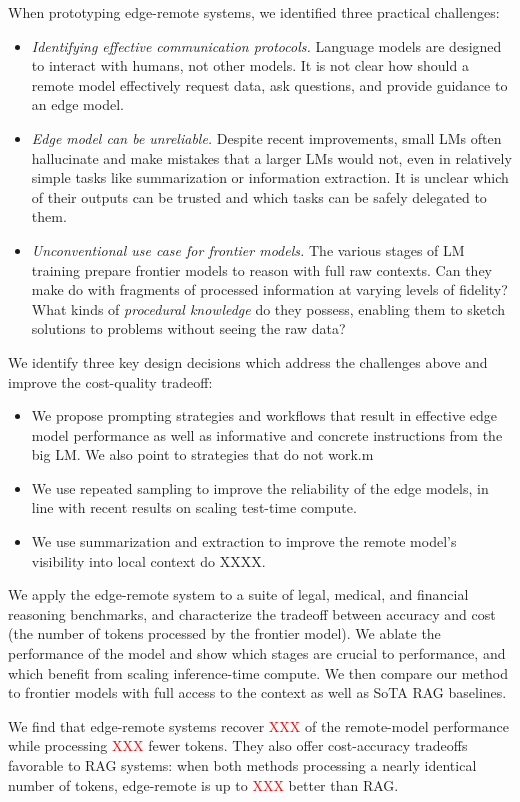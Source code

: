 When prototyping edge-remote systems, we identified three practical challenges: 

\begin{itemize}
    \item \emph{Identifying effective communication protocols.} Language models are designed to interact with humans, not other models. It is not clear how should a remote model effectively request data, ask questions, and provide guidance to an edge model.
    \item \emph{Edge model can be unreliable.} Despite recent improvements, small LMs often hallucinate and make mistakes that a larger LMs would not, even in relatively simple tasks like summarization or information extraction. It is unclear which of their outputs can be trusted and which tasks can be safely delegated to them.
    \item \emph{Unconventional use case for frontier models.} The various stages of LM training prepare frontier models to reason with full raw contexts. Can they make do with fragments of processed information at varying levels of fidelity? What kinds of \emph{procedural knowledge} do they possess, enabling them to sketch solutions to problems without seeing the raw data?
\end{itemize}

We identify three key design decisions which address the challenges above and improve the cost-quality tradeoff:

\begin{itemize}
    \item We propose prompting strategies and workflows that result in effective edge model performance as well as informative and concrete instructions from the big LM. We also point to strategies that do not work.m
    \item We use repeated sampling to improve the reliability of the edge models, in line with recent results on scaling test-time compute. 
    \item We use summarization and extraction to improve the remote model’s visibility into local context do XXXX.
\end{itemize}

We apply the edge-remote system to a suite of legal, medical, and financial reasoning benchmarks, and characterize the tradeoff between accuracy and cost (the number of tokens processed by the frontier model). We ablate the performance of the model and show which stages are crucial to performance, and which benefit from scaling inference-time compute. We then compare our method to frontier models with full access to the context as well as SoTA RAG baselines. 

We find that edge-remote systems recover \textcolor{red}{XXX} of the remote-model performance while processing \textcolor{red}{XXX} fewer tokens. They also offer cost-accuracy tradeoffs favorable to RAG systems: when both methods processing a nearly identical number of tokens, edge-remote is up to \textcolor{red}{XXX} better than RAG. 
